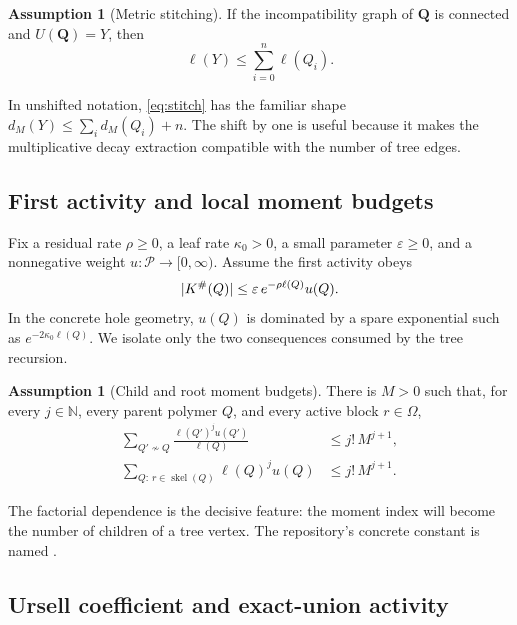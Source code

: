 \documentclass[11pt,a4paper]{article}
\theoremstyle{definition}
\newtheorem{assumption}[theorem]{Assumption}
\newcommand{\skel}{\operatorname{skel}}
\newcommand{\Poly}{\mathcal P}
\newcommand{\eps}{\varepsilon}
\newcommand{\Ksharp}{K^{\#}}
\newcommand{\NN}{\mathbb N}
\DeclarePairedDelimiter{\abs}{\lvert}{\rvert}
\begin{document}
\begin{assumption}[Metric stitching]
\label{ass:stitch}
If the incompatibility graph of $\bm Q$ is connected and $U(\bm Q)=Y$, then
\begin{equation*}
  \ell(Y)\le \sum_{i=0}^{n}\ell(Q_i).
  \tag{S}\label{eq:stitch}
\end{equation*}
\end{assumption}

In unshifted notation, \eqref{eq:stitch} has the familiar shape
$d_M(Y)\le\sum_i d_M(Q_i)+n$.  The shift by one is useful because it makes the
multiplicative decay extraction compatible with the number of tree edges.

\subsection{First activity and local moment budgets}

Fix a residual rate $\rho\ge0$, a leaf rate $\kappa_0>0$, a small parameter
$\eps\ge0$, and a nonnegative weight $u:\Poly\to[0,\infty)$.  Assume the first
activity obeys
\begin{equation}
  \abs{\Ksharp(Q)}\le \eps\,e^{-\rho\ell(Q)}u(Q).
  \label{eq:ksharp-input}
\end{equation}
In the concrete hole geometry, $u(Q)$ is dominated by a spare exponential such as
$e^{-2\kappa_0\ell(Q)}$.  We isolate only the two consequences consumed by the tree
recursion.

\begin{assumption}[Child and root moment budgets]
\label{ass:moments}
There is $M>0$ such that, for every $j\in\NN$, every parent polymer $Q$, and every
active block $r\in\Omega$,
\begin{align*}
  \sum_{Q'\not\sim Q}
    \frac{\ell(Q')^j u(Q')}{\ell(Q)}
  &\le j!\,M^{j+1},
  \tag{C$_j$}\label{eq:child-budget}\\
  \sum_{Q:\,r\in\skel(Q)}\ell(Q)^j u(Q)
  &\le j!\,M^{j+1}.
  \tag{R$_j$}\label{eq:root-budget}
\end{align*}
\end{assumption}

The factorial dependence is the decisive feature: the moment index will become the
number of children of a tree vertex.  The repository's concrete constant is named
.

\subsection{Ursell coefficient and exact-union activity}
\end{document}
